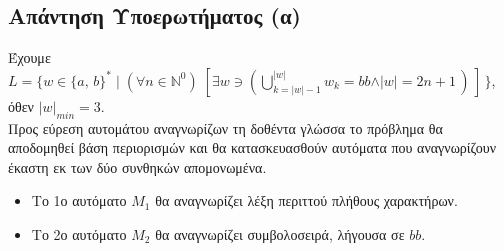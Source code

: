 \subsection{Απάντηση Υποερωτήματος (α)}
\label{ssec:Solution_2.1}
\doublespacing
Έχουμε $L = \{w \in \{a,\,b\}^* \;\vert\; (\forall n \in \mathbb{N}^0)\;[\exists w \ni (\bigcup\limits_{k =
|w|-1}^{|w|}w_k = bb \land \vert w \vert = 2n+1\,)\,]\,\}$, \\
όθεν $\vert w\vert_{min} = 3$.\\
 Προς εύρεση αυτομάτου αναγνωρίζων τη δοθέντα γλώσσα το πρόβλημα
θα αποδομηθεί βάση περιορισμών και θα κατασκευασθούν αυτόματα που αναγνωρίζουν έκαστη εκ
των δύο συνθηκών απομονωμένα.

\begin{itemize}
	\itemsep0em
	\item Το 1ο αυτόματο $M_{1}$ θα αναγνωρίζει λέξη περιττού πλήθους χαρακτήρων.
	\item Το 2ο αυτόματο $M_{2}$ θα αναγνωρίζει συμβολοσειρά, λήγουσα σε $bb$.
\end{itemize}

